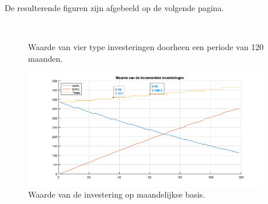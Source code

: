 

De resulterende figuren zijn afgebeeld op de volgende pagina.

\thispagestyle{empty}

\vspace*{\fill}

\begin{figure}[h]
\centering
{}\\
\caption{Waarde van vier type investeringen doorheen een periode van 120 maanden.}%
\label{fig:op8}
\end{figure}

\begin{figure}[h]
\centering
\includegraphics[width=0.95\textwidth]{res/op9b.png}
\caption{Waarde van de investering op maandelijkse basis.}
\label{fig:op9a}
\end{figure}

\vspace*{\fill}

\restoregeometry












